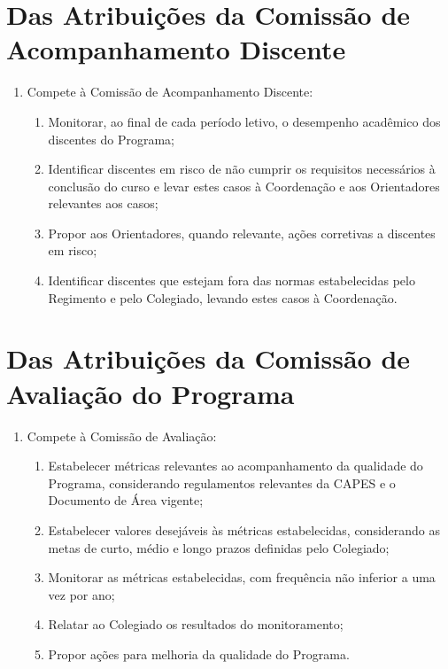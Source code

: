 \documentclass{article}
\begin{document}
\section{Das Atribuições da Comissão de Acompanhamento Discente}
\begin{enumerate}
	\item Compete à Comissão de Acompanhamento Discente:
	\begin{enumerate}[label=\Roman*]
		\item Monitorar, ao final de cada período letivo, o desempenho acadêmico dos discentes do Programa;
		\item Identificar discentes em risco de não cumprir os requisitos necessários à conclusão do curso e levar estes casos à Coordenação e aos Orientadores relevantes aos casos;
		\item Propor aos Orientadores, quando relevante, ações corretivas a discentes em risco;
		\item Identificar discentes que estejam fora das normas estabelecidas pelo Regimento e pelo Colegiado, levando estes casos à Coordenação.
	\end{enumerate}
\end{enumerate}

\section{Das Atribuições da Comissão de Avaliação do Programa}
\begin{enumerate}
	\item Compete à Comissão de Avaliação:
	\begin{enumerate}[label=\Roman*]
		\item Estabelecer métricas relevantes ao acompanhamento da qualidade do Programa, considerando regulamentos relevantes da CAPES e o Documento de Área vigente;
		\item Estabelecer valores desejáveis às métricas estabelecidas, considerando as metas de curto, médio e longo prazos definidas pelo Colegiado;
		\item Monitorar as métricas estabelecidas, com frequência não inferior a uma vez por ano;
		\item Relatar ao Colegiado os resultados do monitoramento;
		\item Propor ações para melhoria da qualidade do Programa.
	\end{enumerate}
\end{enumerate}
\end{document}
